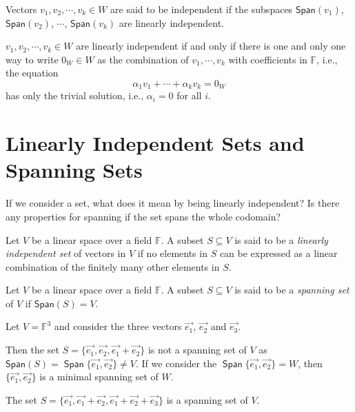 \documentclass[
	11pt, %
	fleqn, %
	a4paper, %
]{LegrandOrangeBook}
\renewcommand{\span}[1]{\mathsf{Span}(#1)} %
\newcommand{\F}{\mathbb{F}} %
\DeclareMathOperator{\Span}{\mathsf{Span}}
\begin{document}
Vectors $v_1, v_2, \cdots, v_k \in W$ are said to be independent if the subspaces $\span{v_1}$, $\span{v_2}$, $\cdots$, $\span{v_k}$ are linearly independent.

\begin{proposition}
    $v_1, v_2, \cdots, v_k \in W$ are linearly independent if and only if there is one and only one way to write $0_W \in W$ as the combination of $v_1, \cdots, v_k$ with coefficients in $\F$, i.e., the equation 
    \[
        \alpha_1 v_1 + \cdots + \alpha_k v_k = 0_W
    \]
    has only  the trivial solution, i.e., $\alpha_i = 0$ for all $i$.
\end{proposition}

\newpage

\section{Linearly Independent Sets and Spanning Sets}

If we consider a set, what does it mean by being linearly independent? Is there any properties for spanning if the set spans the whole codomain?

\begin{definition}
    Let $V$ be a linear space over a field $\F$. A subset $S \subseteq V$ is said to be a \emph{linearly independent set} of vectors in $V$ if no elements in $S$ can be expressed as a linear combination of the finitely many other elements in $S$.
\end{definition}

\begin{definition}
    Let $V$ be a linear space over a field $\F$. A subset $S \subseteq V$ is said to be a \emph{spanning set} of $V$ if $\span{S} = V$.
\end{definition}

\begin{example}
    Let $V = \F^3$ and consider the three vectors $\vec{e_1}$, $\vec{e_2}$ and $\vec{e_3}$. 
    
    Then the set $S = \{\vec{e_1}, \vec{e_2}, \vec{e_1} + \vec{e_2}\}$ is not a spanning set of $V$ as $\span{S} = \Span \{\vec{e_1}, \vec{e_2}\} \neq V$. If we consider the $\Span \{\vec{e_1}, \vec{e_2}\} = W$, then $\{\vec{e_1}, \vec{e_2}\}$ is a minimal spanning set of $W$.

    The set $S = \{\vec{e_1}, \vec{e_1} + \vec{e_2}, \vec{e_1} + \vec{e_2} + \vec{e_3}\}$ is a spanning set of $V$.
\end{example}
\end{document}
